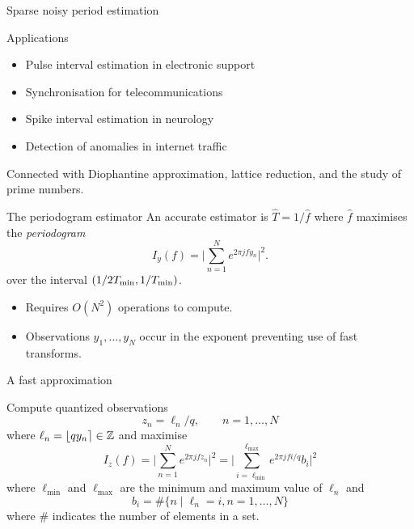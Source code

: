 \documentclass[final,hyperref={pdfpagelabels=false}]{beamer}
\begin{document}
\begin{columns}[t]
\begin{column}{.49\textwidth}
\begin{block}{Sparse noisy period estimation}
\end{block}  

\begin{block}{Applications}
\begin{itemize}
\item Pulse interval estimation in electronic support%
\item Synchronisation for telecommunications%
\item Spike interval estimation in neurology%
\item Detection of anomalies in internet traffic%
\end{itemize}
Connected with Diophantine approximation, lattice reduction, and the study of prime numbers.%
\end{block}

\newcommand{\abs}[1]{\left\vert #1 \right\vert}
\newcommand{\sabs}[1]{\vert #1 \vert}
\newcommand{\babs}[1]{\big\vert #1 \big\vert}


\begin{block}{The periodogram estimator}
An accurate estimator is $\hat{T} = 1/\hat{f}$ where $\hat{f}$ maximises the \emph{periodogram}
\[
I_y(f) = \babs{ \sum_{n=1}^N e^{ 2\pi j f y_n} }^2.
\]
over the interval $(1/2T_{\text{min}}, 1/T_{\text{min}})$.  
\begin{itemize}
\item Requires $O(N^2)$ operations to compute. 
\item Observations $y_1,\dots,y_N$ occur in the exponent preventing use of fast transforms.
\end{itemize}
\end{block}

\newcommand{\ellmin}{\ell_{\text{min}}}
\newcommand{\ellmax}{\ell_{\text{max}}}

\begin{block}{A fast approximation}

Compute quantized observations
\[
z_n =  \ell_n/q, \qquad n = 1,\dots,N
\] 
where $\ell_n = \left\lfloor qy_n \right\rceil \in {\mathbb Z}$ and maximise
\[
I_z(f) = \babs{ \sum_{n=1}^N e^{ 2\pi j f z_n} }^2 = \babs{ \sum_{i = \ellmin}^{\ellmax} e^{2\pi j f i/q} b_i }^2
\]
where $\ellmin$ and $\ellmax$ are the minimum and maximum value of $\ell_n$ and
\[
b_i= \#\{ n \mid \ell_n = i, n = 1,\dots, N\}
\]
where $\#$ indicates the number of elements in a set.


\end{block}
\end{column}
\end{columns}
\end{document}
